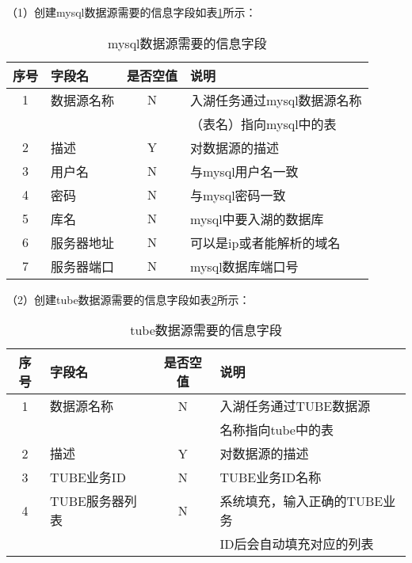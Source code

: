 （1）创建mysql数据源需要的信息字段如表\ref{tab:mysql数据源需要的信息字段}所示：

\begin{table}[H]
  \centering
  \caption{mysql数据源需要的信息字段}
  \label{tab:mysql数据源需要的信息字段}
  \begin{tabular}{clcl}
    \toprule
    序号  & 字段名     & 是否空值   & 说明    \\
    \midrule
    1    & 数据源名称  & N        & 入湖任务通过mysql数据源名称  \\
         &           &          & （表名）指向mysql中的表      \\
    2    & 描述       & Y        & 对数据源的描述                                \\
    3    & 用户名     & N        & 与mysql用户名一致                             \\
    4    & 密码       & N        &  与mysql密码一致                             \\
    5    & 库名       & N        &   mysql中要入湖的数据库                       \\
    6    & 服务器地址  & N        &  可以是ip或者能解析的域名                      \\
    7    & 服务器端口  & N        &   mysql数据库端口号                          \\
    \bottomrule
  \end{tabular}
\end{table}

（2）创建tube数据源需要的信息字段如表\ref{tab:tube数据源需要的信息字段}所示：

\begin{table}[H]
  \centering
  \caption{tube数据源需要的信息字段}
  \label{tab:tube数据源需要的信息字段}
  \begin{tabular}{clcl}
    \toprule
    序号  & 字段名     & 是否空值   & 说明                                      \\
    \midrule
    1    & 数据源名称  & N        & 入湖任务通过TUBE数据源   \\
         &           &          & 名称指向tube中的表       \\
    2    & 描述       & Y        & 对数据源的描述                                \\
    3    & TUBE业务ID     & N        & TUBE业务ID名称                             \\
    4    & TUBE服务器列表       & N        &  系统填充，输入正确的TUBE业务     \\
         &                   &            &  ID后会自动填充对应的列表         \\
    \bottomrule
  \end{tabular}
\end{table}

